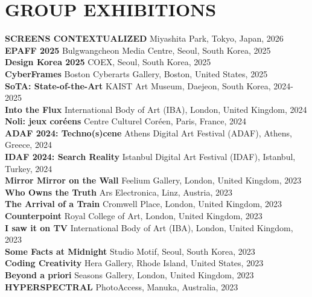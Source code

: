 \documentclass[a4paper,9pt]{extarticle}
\begin{document}
\section*{GROUP EXHIBITIONS}

\noindent
\textbf{SCREENS CONTEXTUALIZED} \hfill Miyashita Park, Tokyo, Japan, 2026\\
\textbf{EPAFF 2025} \hfill Bulgwangcheon Media Centre, Seoul, South Korea, 2025\\
\textbf{Design Korea 2025} \hfill COEX, Seoul, South Korea, 2025\\
\textbf{CyberFrames} \hfill Boston Cyberarts Gallery, Boston, United States, 2025\\
\textbf{SoTA: State-of-the-Art} \hfill KAIST Art Museum, Daejeon, South Korea, 2024-2025\\
\textbf{Into the Flux} \hfill International Body of Art (IBA), London, United Kingdom, 2024\\
\textbf{Noli: jeux coréens} \hfill Centre Culturel Coréen, Paris, France, 2024\\
\textbf{ADAF 2024: Techno(s)cene} \hfill Athens Digital Art Festival (ADAF), Athens, Greece, 2024\\
\textbf{IDAF 2024: Search Reality} \hfill Istanbul Digital Art Festival (IDAF), Istanbul, Turkey, 2024\\
\textbf{Mirror Mirror on the Wall} \hfill Feelium Gallery, London, United Kingdom, 2023\\
\textbf{Who Owns the Truth} \hfill Ars Electronica, Linz, Austria, 2023\\
\textbf{The Arrival of a Train} \hfill Cromwell Place, London, United Kingdom, 2023\\
\textbf{Counterpoint} \hfill Royal College of Art, London, United Kingdom, 2023\\
\textbf{I saw it on TV} \hfill International Body of Art (IBA), London, United Kingdom, 2023\\
\textbf{Some Facts at Midnight} \hfill Studio Motif, Seoul, South Korea, 2023\\
\textbf{Coding Creativity} \hfill Hera Gallery, Rhode Island, United States, 2023\\
\textbf{Beyond a priori} \hfill Seasons Gallery, London, United Kingdom, 2023\\
\textbf{HYPERSPECTRAL} \hfill PhotoAccess, Manuka, Australia, 2023\\
\end{document}
